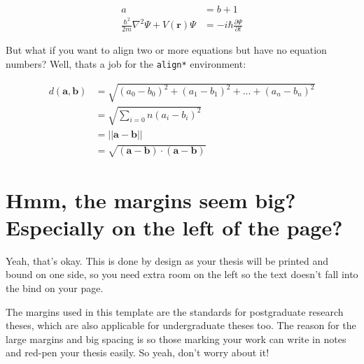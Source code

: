 \begin{framed}
\begin{align}
a &= b + 1 
\label{eqn:example1} \\
\frac{\hbar^2}{2m}\nabla^2\Psi + V(\mathbf{r})\Psi
&= -i\hbar \frac{\partial\Psi}{\partial t}    
\label{eqn:example2}
\end{align}
\end{framed}

But what if you want to align two or more equations but have no equation numbers? Well, thats a job for the \texttt{align*} environment:

\begin{framed}
\begin{align*}
d(\mathbf{a}, \mathbf{b}) &= \sqrt{(a_0 - b_0)^2 + (a_1 - b_1)^2 + ... + (a_n - b_n)^2} \\
        &= \sqrt{\sum_{i=0}{n}{(a_i - b_i)^2}} \\
        &= || \mathbf{a} - \mathbf{b} || \\
        &= \sqrt{(\mathbf{a} - \mathbf{b}) \cdot (\mathbf{a} - \mathbf{b})}
\end{align*}
\end{framed}


\section{Hmm, the margins seem big? Especially on the left of the page?}
Yeah, that's okay. This is done by design as your thesis will be printed and bound on one side, so you need extra room on the left so the text doesn't fall into the bind on your page.

The margins used in this template are the standards for postgraduate research theses, which are also applicable for undergraduate theses too. The reason for the large margins and big spacing is so those marking your work can write in notes and red-pen your thesis easily. So yeah, don't worry about it!

\cleardoublepage